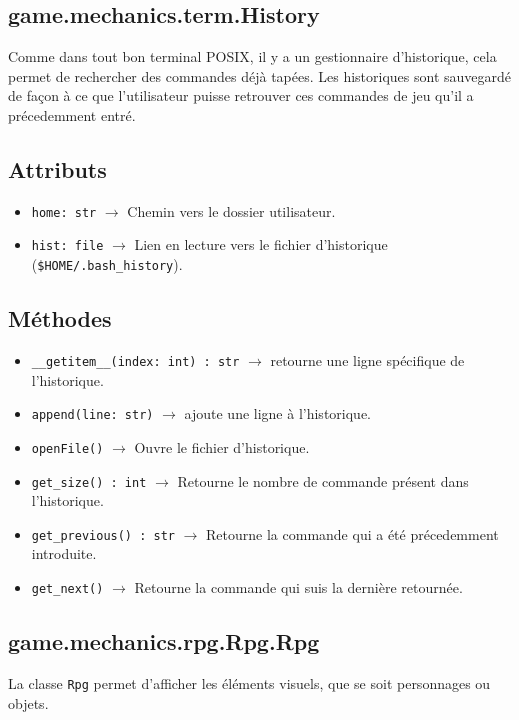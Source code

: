 \documentclass{report}
\begin{document}
\subsection{game.mechanics.term.History}
Comme dans tout bon terminal POSIX, il y a un gestionnaire d’historique, cela permet de rechercher des commandes déjà tapées.
Les historiques sont sauvegardé de façon à ce que l'utilisateur puisse retrouver ces commandes de jeu qu'il a précedemment entré.

\subsection*{Attributs}

\begin{itemize}
  \item \texttt{home: str}	$\rightarrow$ Chemin vers le dossier utilisateur.
  \item \texttt{hist: file}		$\rightarrow$ Lien en lecture vers le fichier d’historique (\texttt{\$HOME/.bash_history}). %
\end{itemize}

\subsection*{Méthodes}
\begin{itemize}
\item \texttt{__getitem__(index: int) : str}	$\rightarrow$ retourne une ligne spécifique de l’historique.
\item \texttt{append(line: str)}	$\rightarrow$  ajoute une ligne à l’historique.
\item \texttt{openFile()}	$\rightarrow$ Ouvre le fichier d’historique.
\item \texttt{get_size() : int}	$\rightarrow$ Retourne le nombre de commande présent dans l'historique.
\item \texttt{get_previous() : str}	$\rightarrow$ Retourne la commande qui a été précedemment introduite.
\item \texttt{get_next()}	$\rightarrow$ Retourne la commande qui suis la dernière retournée.

\end{itemize}

\newpage

\subsection{game.mechanics.rpg.Rpg.Rpg}
La classe \texttt{Rpg} permet d’afficher les éléments visuels, que se soit personnages ou objets.
\end{document}
